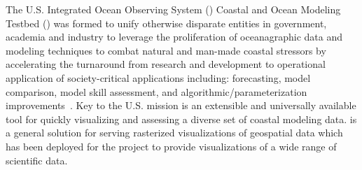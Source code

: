 The U.S. Integrated Ocean Observing System (\ioos{}) Coastal and Ocean
Modeling Testbed (\comt{}) was formed to unify otherwise disparate
entities in government, academia and industry to leverage the
proliferation of oceanagraphic data and modeling techniques to combat
natural and man-made coastal stressors by accelerating the turnaround
from research and development to operational application of
society-critical applications including: forecasting, model
comparison, model skill assessment, and algorithmic/parameterization
improvements~\cite{luettich13}. Key to the U.S. \ioos{} \comt{}
mission is an extensible and universally available tool for quickly
visualizing and assessing a diverse set of coastal modeling
data. \sciwms{} is a general \ogc{} \wms{} solution for serving
rasterized visualizations of geospatial data which has been deployed
for the \comt{} project to provide visualizations of a wide range of
scientific data.
